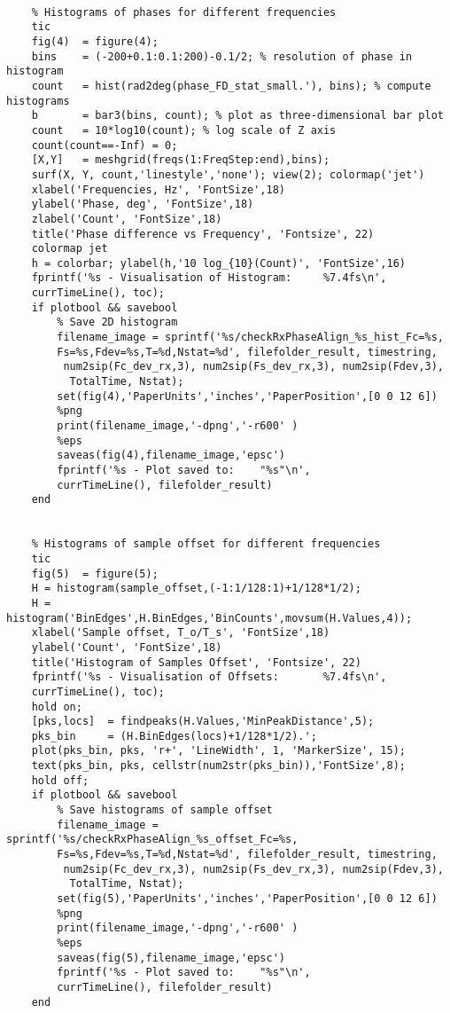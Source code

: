 \begin{verbatim}
    
    % Histograms of phases for different frequencies
    tic
    fig(4)  = figure(4);
    bins   	= (-200+0.1:0.1:200)-0.1/2; % resolution of phase in histogram
    count  	= hist(rad2deg(phase_FD_stat_small.'), bins); % compute histograms
    b      	= bar3(bins, count); % plot as three-dimensional bar plot
    count   = 10*log10(count); % log scale of Z axis
    count(count==-Inf) = 0;
    [X,Y]   = meshgrid(freqs(1:FreqStep:end),bins);
    surf(X, Y, count,'linestyle','none'); view(2); colormap('jet')
    xlabel('Frequencies, Hz', 'FontSize',18)
    ylabel('Phase, deg', 'FontSize',18)
    zlabel('Count', 'FontSize',18)
    title('Phase difference vs Frequency', 'Fontsize', 22)
    colormap jet
    h = colorbar; ylabel(h,'10 log_{10}(Count)', 'FontSize',16)
    fprintf('%s - Visualisation of Histogram:     %7.4fs\n', 
    currTimeLine(), toc);
    if plotbool && savebool
        % Save 2D histogram
        filename_image = sprintf('%s/checkRxPhaseAlign_%s_hist_Fc=%s,
        Fs=%s,Fdev=%s,T=%d,Nstat=%d', filefolder_result, timestring,
         num2sip(Fc_dev_rx,3), num2sip(Fs_dev_rx,3), num2sip(Fdev,3),
          TotalTime, Nstat);
        set(fig(4),'PaperUnits','inches','PaperPosition',[0 0 12 6])
        %png
        print(filename_image,'-dpng','-r600' )
        %eps
        saveas(fig(4),filename_image,'epsc')
        fprintf('%s - Plot saved to:    "%s"\n', 
        currTimeLine(), filefolder_result)
    end  
    
    
    % Histograms of sample offset for different frequencies
    tic
    fig(5)  = figure(5);
    H = histogram(sample_offset,(-1:1/128:1)+1/128*1/2);
    H = histogram('BinEdges',H.BinEdges,'BinCounts',movsum(H.Values,4));
    xlabel('Sample offset, T_o/T_s', 'FontSize',18)
    ylabel('Count', 'FontSize',18)
    title('Histogram of Samples Offset', 'Fontsize', 22)
    fprintf('%s - Visualisation of Offsets:       %7.4fs\n', 
    currTimeLine(), toc);
    hold on; 
    [pks,locs]  = findpeaks(H.Values,'MinPeakDistance',5);
    pks_bin     = (H.BinEdges(locs)+1/128*1/2).';
    plot(pks_bin, pks, 'r+', 'LineWidth', 1, 'MarkerSize', 15);
    text(pks_bin, pks, cellstr(num2str(pks_bin)),'FontSize',8);
    hold off;
    if plotbool && savebool
        % Save histograms of sample offset
        filename_image = sprintf('%s/checkRxPhaseAlign_%s_offset_Fc=%s,
        Fs=%s,Fdev=%s,T=%d,Nstat=%d', filefolder_result, timestring,
         num2sip(Fc_dev_rx,3), num2sip(Fs_dev_rx,3), num2sip(Fdev,3),
          TotalTime, Nstat);
        set(fig(5),'PaperUnits','inches','PaperPosition',[0 0 12 6])
        %png
        print(filename_image,'-dpng','-r600' )
        %eps
        saveas(fig(5),filename_image,'epsc')
        fprintf('%s - Plot saved to:    "%s"\n', 
        currTimeLine(), filefolder_result)    
    end
    

\end{verbatim}
